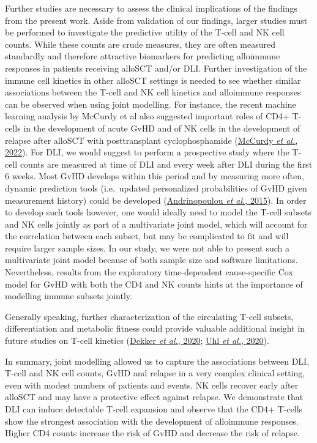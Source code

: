 \documentclass[
  letterpaper,
  DIV=11,
  numbers=noendperiod]{scrreprt}
\begin{document}
Further studies are necessary to assess the clinical implications of the
findings from the present work. Aside from validation of our findings,
larger studies must be performed to investigate the predictive utility
of the T-cell and NK cell counts. While these counts are crude measures,
they are often measured standardly and therefore attractive biomarkers
for predicting alloimmune responses in patients receiving alloSCT and/or
DLI. Further investigation of the immune cell kinetics in other alloSCT
settings is needed to see whether similar associations between the
T-cell and NK cell kinetics and alloimmune responses can be observed
when using joint modelling. For instance, the recent machine learning
analysis by McCurdy et al also suggested important roles of CD4+ T-cells
in the development of acute GvHD and of NK cells in the development of
relapse after alloSCT with posttransplant cyclophosphamide
(\protect\hyperlink{ref-mccurdySignaturesGVHDRelapse2022}{McCurdy
\emph{et al.}, 2022}). For DLI, we would suggest to perform a
prospective study where the T-cell counts are measured at time of DLI
and every week after DLI during the first 6 weeks. Most GvHD develops
within this period and by measuring more often, dynamic prediction tools
(i.e.~updated personalized probabilities of GvHD given measurement
history) could be developed
(\protect\hyperlink{ref-andrinopoulouDynamicPredictionOutcome2015}{Andrinopoulou
\emph{et al.}, 2015}). In order to develop such tools however, one would
ideally need to model the T-cell subsets and NK cells jointly as part of
a multivariate joint model, which will account for the correlation
between each subset, but may be complicated to fit and will require
larger sample sizes. In our study, we were not able to present such a
multivariate joint model because of both sample size and software
limitations. Nevertheless, results from the exploratory time-dependent
cause-specific Cox model for GvHD with both the CD4 and NK counts hints
at the importance of modelling immune subsets jointly.

Generally speaking, further characterization of the circulating T-cell
subsets, differentiation and metabolic fitness could provide valuable
additional insight in future studies on T-cell kinetics
(\protect\hyperlink{ref-dekkerReconstitutionCellSubsets2020a}{Dekker
\emph{et al.}, 2020};
\protect\hyperlink{ref-uhlMetabolicReprogrammingDonor2020}{Uhl \emph{et
al.}, 2020}).

In summary, joint modelling allowed us to capture the associations
between DLI, T-cell and NK cell counts, GvHD and relapse in a very
complex clinical setting, even with modest numbers of patients and
events. NK cells recover early after alloSCT and may have a protective
effect against relapse. We demonstrate that DLI can induce detectable
T-cell expansion and observe that the CD4+ T-cells show the strongest
association with the development of alloimmune responses. Higher CD4
counts increase the risk of GvHD and decrease the risk of relapse.
\end{document}
